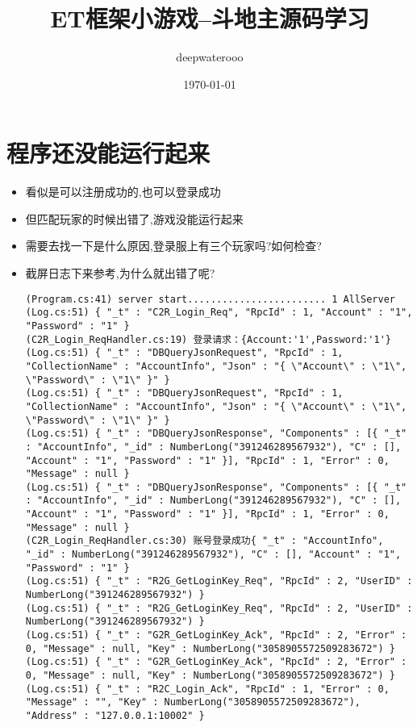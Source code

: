 \documentclass[9pt, b5paper]{article}
\author{deepwaterooo}
\date{\today}
\title{ET框架小游戏--斗地主源码学习}
\begin{document}
\maketitle
\tableofcontents


\section{程序还没能运行起来}
\label{sec-1}
\begin{itemize}
\item 看似是可以注册成功的,也可以登录成功
\item 但匹配玩家的时候出错了,游戏没能运行起来
\item 需要去找一下是什么原因,登录服上有三个玩家吗?如何检查?
\item 截屏日志下来参考,为什么就出错了呢?
\begin{verbatim}
(Program.cs:41) server start........................ 1 AllServer
(Log.cs:51) { "_t" : "C2R_Login_Req", "RpcId" : 1, "Account" : "1", "Password" : "1" }
(C2R_Login_ReqHandler.cs:19) 登录请求：{Account:'1',Password:'1'}
(Log.cs:51) { "_t" : "DBQueryJsonRequest", "RpcId" : 1, "CollectionName" : "AccountInfo", "Json" : "{ \"Account\" : \"1\", \"Password\" : \"1\" }" }
(Log.cs:51) { "_t" : "DBQueryJsonRequest", "RpcId" : 1, "CollectionName" : "AccountInfo", "Json" : "{ \"Account\" : \"1\", \"Password\" : \"1\" }" }
(Log.cs:51) { "_t" : "DBQueryJsonResponse", "Components" : [{ "_t" : "AccountInfo", "_id" : NumberLong("391246289567932"), "C" : [], "Account" : "1", "Password" : "1" }], "RpcId" : 1, "Error" : 0, "Message" : null }
(Log.cs:51) { "_t" : "DBQueryJsonResponse", "Components" : [{ "_t" : "AccountInfo", "_id" : NumberLong("391246289567932"), "C" : [], "Account" : "1", "Password" : "1" }], "RpcId" : 1, "Error" : 0, "Message" : null }
(C2R_Login_ReqHandler.cs:30) 账号登录成功{ "_t" : "AccountInfo", "_id" : NumberLong("391246289567932"), "C" : [], "Account" : "1", "Password" : "1" }
(Log.cs:51) { "_t" : "R2G_GetLoginKey_Req", "RpcId" : 2, "UserID" : NumberLong("391246289567932") }
(Log.cs:51) { "_t" : "R2G_GetLoginKey_Req", "RpcId" : 2, "UserID" : NumberLong("391246289567932") }
(Log.cs:51) { "_t" : "G2R_GetLoginKey_Ack", "RpcId" : 2, "Error" : 0, "Message" : null, "Key" : NumberLong("3058905572509283672") }
(Log.cs:51) { "_t" : "G2R_GetLoginKey_Ack", "RpcId" : 2, "Error" : 0, "Message" : null, "Key" : NumberLong("3058905572509283672") }
(Log.cs:51) { "_t" : "R2C_Login_Ack", "RpcId" : 1, "Error" : 0, "Message" : "", "Key" : NumberLong("3058905572509283672"), "Address" : "127.0.0.1:10002" }

\end{verbatim}
\end{itemize}
\end{document}
